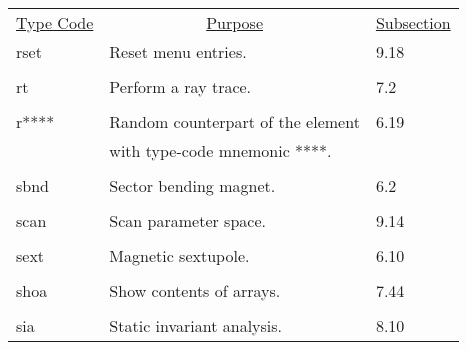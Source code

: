 \begin{center}
\newpage
\begin{tabular}{lll}
\multicolumn{1}{c}{\underline {Type Code}} &
\multicolumn{1}{c}{\underline{Purpose}}   &
\multicolumn{1}{c}{\underline{Subsection}} \\
\hspace{1.5em}rset   &  Reset menu entries.    &        \hspace{2em}9.18\\
\vspace{-3mm}& &\\
\hspace{1.5em}rt    &     Perform a ray trace.  & \hspace{2em}7.2\\
\vspace{-3mm}& &\\
\hspace{1.5em}r****   &  Random counterpart of the element   &  \hspace{2em}6.19\\
               &         with type-code mnemonic ****.        &      \\
\vspace{-3mm}& &\\
\hspace{1.5em}sbnd    &    Sector bending magnet.  &  \hspace{2em}6.2\\
\vspace{-3mm}& &\\
\hspace{1.5em}scan   &   Scan parameter space.   &        \hspace{2em}9.14\\
\vspace{-3mm}& &\\
\hspace{1.5em}sext    &   Magnetic sextupole.       &  \hspace{2em}6.10\\
\vspace{-3mm}& &\\
\hspace{1.5em}shoa    &   Show contents of arrays.       &  \hspace{2em}7.44\\
\vspace{-3mm}& &\\
\hspace{1.5em}sia     &    Static invariant analysis.     &  \hspace{2em}8.10\\

\end{tabular}
\end{center}
